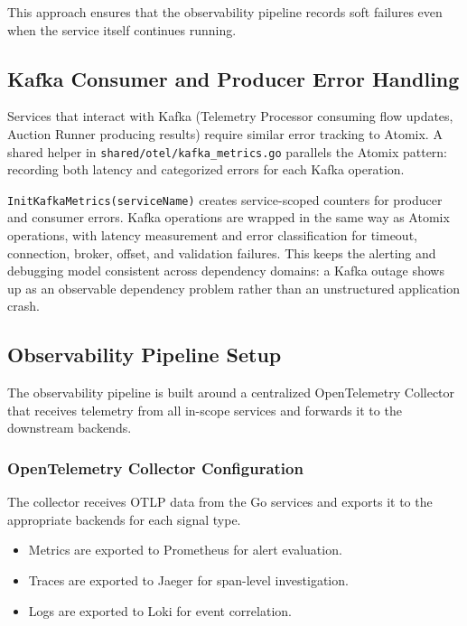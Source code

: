 This approach ensures that the observability pipeline records soft failures even when the service itself continues running.

\subsection{Kafka Consumer and Producer Error Handling}

Services that interact with Kafka (Telemetry Processor consuming flow updates, Auction Runner producing results) require similar error tracking to Atomix. A shared helper in \texttt{shared/otel/kafka\_metrics.go} parallels the Atomix pattern: recording both latency and categorized errors for each Kafka operation.

\texttt{InitKafkaMetrics(serviceName)} creates service-scoped counters for producer and consumer errors. Kafka operations are wrapped in the same way as Atomix operations, with latency measurement and error classification for timeout, connection, broker, offset, and validation failures. This keeps the alerting and debugging model consistent across dependency domains: a Kafka outage shows up as an observable dependency problem rather than an unstructured application crash.

\subsection{Observability Pipeline Setup}

The observability pipeline is built around a centralized OpenTelemetry Collector that receives telemetry from all in-scope services and forwards it to the downstream backends.

\subsubsection{OpenTelemetry Collector Configuration}

The collector receives OTLP data from the Go services and exports it to the appropriate backends for each signal type.

\begin{itemize}
    \item Metrics are exported to Prometheus for alert evaluation.
    \item Traces are exported to Jaeger for span-level investigation.
    \item Logs are exported to Loki for event correlation.
\end{itemize}

